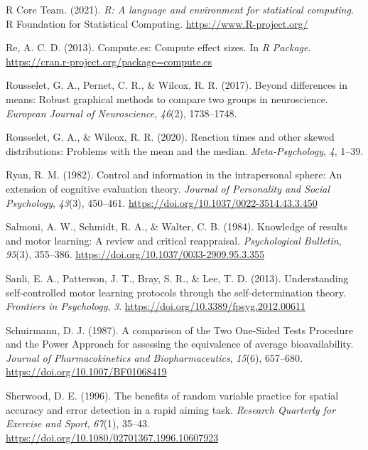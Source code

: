 \documentclass[
  doc, donotrepeattitle,floatsintext]{apa7}
\newlength{\cslhangindent}
\newlength{\cslentryspacingunit} %
\newenvironment{CSLReferences}[2] %
 {%
  \setlength{\parindent}{0pt}
  \ifodd #1
  \let\oldpar\par
  \def\par{\hangindent=\cslhangindent\oldpar}
  \fi
  \setlength{\parskip}{#2\cslentryspacingunit}
 }%
 {}
\begin{document}
\begin{CSLReferences}{1}{0}
\leavevmode{}%
R Core Team. (2021). \emph{R: A language and environment for statistical computing}. R Foundation for Statistical Computing. \url{https://www.R-project.org/}

\leavevmode{}%
Re, A. C. D. (2013). Compute.es: Compute effect sizes. In \emph{R Package}. \url{https://cran.r-project.org/package=compute.es}

\leavevmode{}%
Rousselet, G. A., Pernet, C. R., \& Wilcox, R. R. (2017). Beyond differences in means: Robust graphical methods to compare two groups in neuroscience. \emph{European Journal of Neuroscience}, \emph{46}(2), 1738--1748.

\leavevmode{}%
Rousselet, G. A., \& Wilcox, R. R. (2020). Reaction times and other skewed distributions: Problems with the mean and the median. \emph{Meta-Psychology}, \emph{4}, 1--39.

\leavevmode{}%
Ryan, R. M. (1982). Control and information in the intrapersonal sphere: {An} extension of cognitive evaluation theory. \emph{Journal of Personality and Social Psychology}, \emph{43}(3), 450--461. \url{https://doi.org/10.1037/0022-3514.43.3.450}

\leavevmode{}%
Salmoni, A. W., Schmidt, R. A., \& Walter, C. B. (1984). Knowledge of results and motor learning: A review and critical reappraisal. \emph{Psychological Bulletin}, \emph{95}(3), 355--386. \url{https://doi.org/10.1037/0033-2909.95.3.355}

\leavevmode{}%
Sanli, E. A., Patterson, J. T., Bray, S. R., \& Lee, T. D. (2013). Understanding self-controlled motor learning protocols through the self-determination theory. \emph{Frontiers in Psychology}, \emph{3}. \url{https://doi.org/10.3389/fpsyg.2012.00611}

\leavevmode{}%
Schuirmann, D. J. (1987). A comparison of the Two One-Sided Tests Procedure and the Power Approach for assessing the equivalence of average bioavailability. \emph{Journal of Pharmacokinetics and Biopharmaceutics}, \emph{15}(6), 657--680. \url{https://doi.org/10.1007/BF01068419}

\leavevmode{}%
Sherwood, D. E. (1996). The benefits of random variable practice for spatial accuracy and error detection in a rapid aiming task. \emph{Research Quarterly for Exercise and Sport}, \emph{67}(1), 35--43. \url{https://doi.org/10.1080/02701367.1996.10607923}


\end{CSLReferences}
\end{document}
